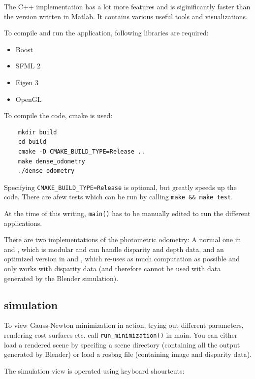 The C++ implementation has a lot more features and is siginificantly faster
than the version written in Matlab. It contains various useful tools and
visualizations.

To compile and run the application, following libraries are required:

\begin{itemize}
    \item Boost
    \item SFML 2
    \item Eigen 3
    \item OpenGL
\end{itemize}

To compile the code, cmake is used:

\begin{verbatim}
    mkdir build
    cd build
    cmake -D CMAKE_BUILD_TYPE=Release ..
    make dense_odometry
    ./dense_odometry
\end{verbatim}

Specifying \texttt{CMAKE\_BUILD\_TYPE=Release} is optional, but greatly speeds up the code.
There are afew tests which can be run by calling \texttt{make \&\& make test}.

At the time of this writing, \texttt{main()} has to be manually edited to run
the different applications.

There are two implementations of the photometric odometry: A normal one in
 and , which is modular and
can handle disparity and depth data, and an optimized version in
 and
, which re-uses as much computation
as possible and only works with disparity data (and therefore cannot be used
with data generated by the Blender simulation).

\subsection{simulation}

To view Gauss-Newton minimization in action, trying out different parameters,
rendering cost surfaces etc. call \texttt{run\_minimization()} in main. You can
either load a rendered scene by specifing a scene directory (containing all the
output generated by Blender) or load a rosbag file (containing image and
disparity data).

The simulation view is operated using keyboard shourtcuts:

